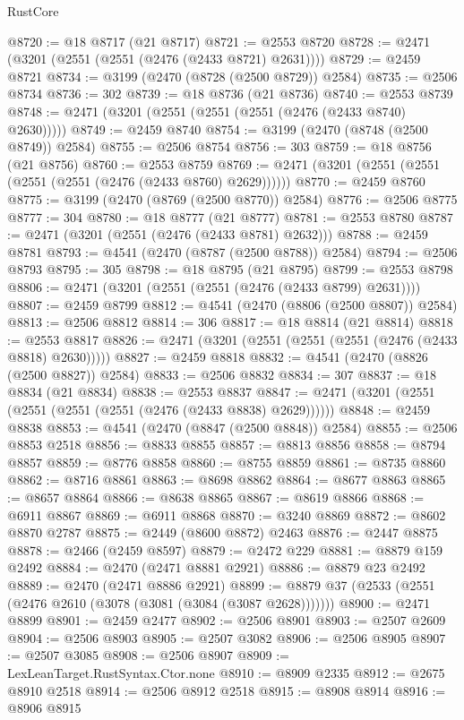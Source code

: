 \begin{lexlean}{RustCore}
\begin{coremodule}
@8720 := @18 @8717 (@21 @8717)
@8721 := @2553 @8720
@8728 := @2471 (@3201 (@2551 (@2551 (@2476 (@2433 @8721) @2631))))
@8729 := @2459 @8721
@8734 := @3199 (@2470 (@8728 (@2500 @8729)) @2584)
@8735 := @2506 @8734
@8736 := 302
@8739 := @18 @8736 (@21 @8736)
@8740 := @2553 @8739
@8748 := @2471 (@3201 (@2551 (@2551 (@2551 (@2476 (@2433 @8740) @2630)))))
@8749 := @2459 @8740
@8754 := @3199 (@2470 (@8748 (@2500 @8749)) @2584)
@8755 := @2506 @8754
@8756 := 303
@8759 := @18 @8756 (@21 @8756)
@8760 := @2553 @8759
@8769 := @2471 (@3201 (@2551 (@2551 (@2551 (@2551 (@2476 (@2433 @8760) @2629))))))
@8770 := @2459 @8760
@8775 := @3199 (@2470 (@8769 (@2500 @8770)) @2584)
@8776 := @2506 @8775
@8777 := 304
@8780 := @18 @8777 (@21 @8777)
@8781 := @2553 @8780
@8787 := @2471 (@3201 (@2551 (@2476 (@2433 @8781) @2632)))
@8788 := @2459 @8781
@8793 := @4541 (@2470 (@8787 (@2500 @8788)) @2584)
@8794 := @2506 @8793
@8795 := 305
@8798 := @18 @8795 (@21 @8795)
@8799 := @2553 @8798
@8806 := @2471 (@3201 (@2551 (@2551 (@2476 (@2433 @8799) @2631))))
@8807 := @2459 @8799
@8812 := @4541 (@2470 (@8806 (@2500 @8807)) @2584)
@8813 := @2506 @8812
@8814 := 306
@8817 := @18 @8814 (@21 @8814)
@8818 := @2553 @8817
@8826 := @2471 (@3201 (@2551 (@2551 (@2551 (@2476 (@2433 @8818) @2630)))))
@8827 := @2459 @8818
@8832 := @4541 (@2470 (@8826 (@2500 @8827)) @2584)
@8833 := @2506 @8832
@8834 := 307
@8837 := @18 @8834 (@21 @8834)
@8838 := @2553 @8837
@8847 := @2471 (@3201 (@2551 (@2551 (@2551 (@2551 (@2476 (@2433 @8838) @2629))))))
@8848 := @2459 @8838
@8853 := @4541 (@2470 (@8847 (@2500 @8848)) @2584)
@8855 := @2506 @8853 @2518
@8856 := @8833 @8855
@8857 := @8813 @8856
@8858 := @8794 @8857
@8859 := @8776 @8858
@8860 := @8755 @8859
@8861 := @8735 @8860
@8862 := @8716 @8861
@8863 := @8698 @8862
@8864 := @8677 @8863
@8865 := @8657 @8864
@8866 := @8638 @8865
@8867 := @8619 @8866
@8868 := @6911 @8867
@8869 := @6911 @8868
@8870 := @3240 @8869
@8872 := @8602 @8870 @2787
@8875 := @2449 (@8600 @8872) @2463
@8876 := @2447 @8875
@8878 := @2466 (@2459 @8597)
@8879 := @2472 @229
@8881 := @8879 @159 @2492
@8884 := @2470 (@2471 @8881 @2921)
@8886 := @8879 @23 @2492
@8889 := @2470 (@2471 @8886 @2921)
@8899 := @8879 @37 (@2533 (@2551 (@2476 @2610 (@3078 (@3081 (@3084 (@3087 @2628)))))))
@8900 := @2471 @8899
@8901 := @2459 @2477
@8902 := @2506 @8901
@8903 := @2507 @2609
@8904 := @2506 @8903
@8905 := @2507 @3082
@8906 := @2506 @8905
@8907 := @2507 @3085
@8908 := @2506 @8907
@8909 := LexLeanTarget.RustSyntax.Ctor.none
@8910 := @8909 @2335
@8912 := @2675 @8910 @2518
@8914 := @2506 @8912 @2518
@8915 := @8908 @8914
@8916 := @8906 @8915

\end{coremodule}
\end{lexlean}
